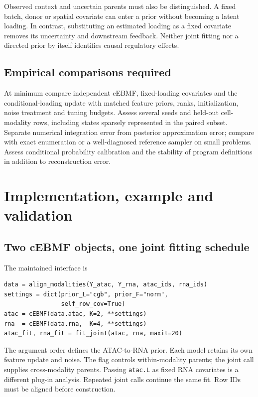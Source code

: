 \documentclass[11pt,a4paper]{article}
\begin{document}
Observed context and uncertain parents must also be distinguished. A fixed
batch, donor or spatial covariate can enter a prior without becoming a
latent loading. In contrast, substituting an estimated loading as a fixed
covariate removes its uncertainty and downstream feedback. Neither joint
fitting nor a directed prior by itself identifies causal regulatory effects.

\subsection{Empirical comparisons required}
At minimum compare independent cEBMF, fixed-loading covariates and the
conditional-loading update with matched feature priors, ranks, initialization,
noise treatment and tuning budgets. Assess several seeds and held-out
cell-modality rows, including states sparsely represented in the paired
subset. Separate numerical integration error from posterior approximation
error; compare with exact enumeration or a well-diagnosed reference sampler
on small problems. Assess conditional probability calibration and the
stability of program definitions in addition to reconstruction error.

\clearpage
\section{Implementation, example and validation}
\label{sec:implementation}
\subsection{Two cEBMF objects, one joint fitting schedule}
The maintained interface is
\begin{verbatim}
data = align_modalities(Y_atac, Y_rna, atac_ids, rna_ids)
settings = dict(prior_L="cgb", prior_F="norm",
                self_row_cov=True)
atac = cEBMF(data.atac, K=2, **settings)
rna  = cEBMF(data.rna,  K=4, **settings)
atac_fit, rna_fit = fit_joint(atac, rna, maxit=20)
\end{verbatim}
The argument order defines the ATAC-to-RNA prior. Each model retains its own
feature update and noise. The flag controls within-modality parents; the
joint call supplies cross-modality parents. Passing \texttt{atac.L} as fixed
RNA covariates is a different plug-in analysis. Repeated joint calls continue
the same fit. Row IDs must be aligned before construction.
\end{document}
